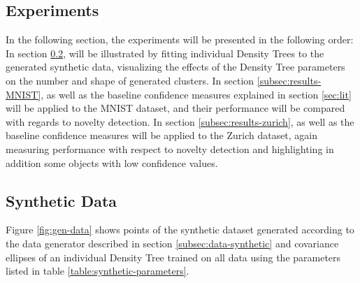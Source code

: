 \documentclass[10pt]{article}
\begin{document}
\subsection{Experiments}
In the following section, the experiments will be presented in the following order: In section \ref{subsec:results-synthetic},  will be illustrated by fitting individual Density Trees to the generated synthetic data, visualizing the effects of the Density Tree parameters on the number and shape of generated clusters. In section \ref{subsec:results-MNIST},  as well as the baseline confidence measures explained in section \ref{sec:lit} will be applied to the \gls{MNIST} dataset, and their performance will be compared with regards to novelty detection. In section \ref{subsec:results-zurich},  as well as the baseline confidence measures will be applied to the Zurich dataset, again measuring performance with respect to novelty detection and highlighting in addition some objects with low confidence values.

\subsection{Synthetic Data}
\label{subsec:results-synthetic}


Figure \ref{fig:gen-data} shows points of the synthetic dataset generated according to the data generator described in section \ref{subsec:data-synthetic} and covariance ellipses of an individual Density Tree trained on all data using the parameters listed in table \ref{table:synthetic-parameters}.
\end{document}
